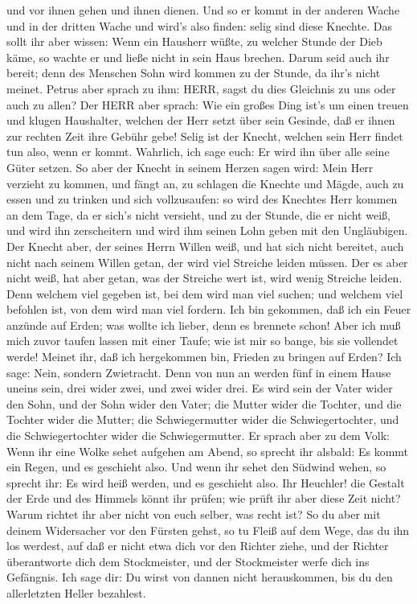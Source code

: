 und vor ihnen gehen und ihnen dienen.  Und so er kommt in
der anderen Wache und in der dritten Wache und wird's also finden: selig
sind diese Knechte.  Das sollt ihr aber wissen: Wenn ein
Hausherr wüßte, zu welcher Stunde der Dieb käme, so wachte er und ließe
nicht in sein Haus brechen.  Darum seid auch ihr bereit;
denn des Menschen Sohn wird kommen zu der Stunde, da ihr's nicht meinet.
 Petrus aber sprach zu ihm: HERR, sagst du dies Gleichnis
zu uns oder auch zu allen?  Der HERR aber sprach: Wie ein
großes Ding ist's um einen treuen und klugen Haushalter, welchen der
Herr setzt über sein Gesinde, daß er ihnen zur rechten Zeit ihre Gebühr
gebe!  Selig ist der Knecht, welchen sein Herr findet tun
also, wenn er kommt.  Wahrlich, ich sage euch: Er wird ihn
über alle seine Güter setzen.  So aber der Knecht in seinem
Herzen sagen wird: Mein Herr verzieht zu kommen, und fängt an, zu
schlagen die Knechte und Mägde, auch zu essen und zu trinken und sich
vollzusaufen:  so wird des Knechtes Herr kommen an dem
Tage, da er sich's nicht versieht, und zu der Stunde, die er nicht weiß,
und wird ihn zerscheitern und wird ihm seinen Lohn geben mit den
Ungläubigen.  Der Knecht aber, der seines Herrn Willen
weiß, und hat sich nicht bereitet, auch nicht nach seinem Willen getan,
der wird viel Streiche leiden müssen.  Der es aber nicht
weiß, hat aber getan, was der Streiche wert ist, wird wenig Streiche
leiden. Denn welchem viel gegeben ist, bei dem wird man viel suchen; und
welchem viel befohlen ist, von dem wird man viel fordern. 
Ich bin gekommen, daß ich ein Feuer anzünde auf Erden; was wollte ich
lieber, denn es brennete schon!  Aber ich muß mich zuvor
taufen lassen mit einer Taufe; wie ist mir so bange, bis sie vollendet
werde!  Meinet ihr, daß ich hergekommen bin, Frieden zu
bringen auf Erden? Ich sage: Nein, sondern Zwietracht. 
Denn von nun an werden fünf in einem Hause uneins sein, drei wider zwei,
und zwei wider drei.  Es wird sein der Vater wider den
Sohn, und der Sohn wider den Vater; die Mutter wider die Tochter, und
die Tochter wider die Mutter; die Schwiegermutter wider die
Schwiegertochter, und die Schwiegertochter wider die Schwiegermutter.
 Er sprach aber zu dem Volk: Wenn ihr eine Wolke sehet
aufgehen am Abend, so sprecht ihr alsbald: Es kommt ein Regen, und es
geschieht also.  Und wenn ihr sehet den Südwind wehen, so
sprecht ihr: Es wird heiß werden, und es geschieht also. 
Ihr Heuchler! die Gestalt der Erde und des Himmels könnt ihr prüfen; wie
prüft ihr aber diese Zeit nicht?  Warum richtet ihr aber
nicht von euch selber, was recht ist?  So du aber mit
deinem Widersacher vor den Fürsten gehst, so tu Fleiß auf dem Wege, das
du ihn los werdest, auf daß er nicht etwa dich vor den Richter ziehe,
und der Richter überantworte dich dem Stockmeister, und der Stockmeister
werfe dich ins Gefängnis.  Ich sage dir: Du wirst von
dannen nicht herauskommen, bis du den allerletzten Heller bezahlest.

